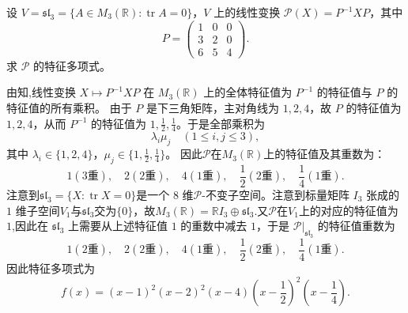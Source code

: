 \documentclass[../../main.tex]{subfiles}%
\begin{document}
\begin{example}
设 $V=\mathfrak{sl}_3=\{A\in M_3(\mathbb R):\operatorname{tr} A=0\}$，$V$ 上的线性变换 $\mathcal P(X)=P^{-1}XP$，其中
\[
P=\begin{pmatrix}1&0&0\\3&2&0\\6&5&4\end{pmatrix}.
\]
求 $\mathcal P$ 的特征多项式。
\end{example}
\begin{solution}
由知,线性变换 $X\mapsto P^{-1}XP$ 在 $M_3(\mathbb R)$ 上的全体特征值为 $P^{-1}$ 的特征值与 $P$ 的特征值的所有乘积。
由于 $P$ 是下三角矩阵，主对角线为 $1,2,4$，故 $P$ 的特征值为 $1,2,4$，从而 $P^{-1}$ 的特征值为 $1,\frac12,\frac14$。于是全部乘积为
\[
\lambda_i\mu_j\quad (1\leqslant i,j\leqslant 3),
\]
其中 $\lambda_i\in\{1,2,4\}$，$\mu_j\in\{1,\frac12,\frac14\}$。
因此$\mathcal P$在$M_3(\mathbb R)$上的特征值及其重数为：
\[
1(3\text{重}),\quad 2(2\text{重}),\quad 4(1\text{重}),\quad \frac12(2\text{重}),\quad \frac14(1\text{重}).
\]
注意到$\mathfrak{sl}_3=\{X:\operatorname{tr}X=0\}$是一个 $8$ 维$\mathcal P$-不变子空间。注意到标量矩阵 $I_3$ 张成的 $1$ 维子空间$V_1$与$\mathfrak{sl}_3$交为$\{0\}$，故$M_3(\mathbb R)=\mathbb R I_3\oplus \mathfrak{sl}_3$.又$\mathcal P$在$V_1$上的对应的特征值为 $1$,因此在 $\mathfrak{sl}_3$ 上需要从上述特征值 $1$ 的重数中减去 $1$，于是 $\mathcal P|_{\mathfrak{sl}_3}$ 的特征值重数为
\[
1(2\text{重}),\quad 2(2\text{重}),\quad 4(1\text{重}),\quad \frac12(2\text{重}),\quad \frac14(1\text{重}).
\]
因此特征多项式为
\[
f(x)=(x-1)^2(x-2)^2(x-4)\left(x-\frac12\right)^2\left(x-\frac14\right).
\]
\end{solution}
\end{document}
